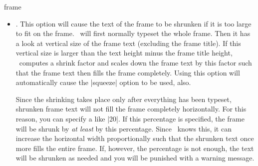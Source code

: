 \begin{environment}{{frame}%
    }
\begin{frame}[<+->][plain]
\begin{frame}[plain]
\begin{itemize}
  \example A frame with a picture completely filling the frame:  
\begin{verbatim}
\begin{frame}[plain]
  \begin{centering}%
    \pgfimage[height=\paperheight]{somebigimagefile}%
    \par%
  \end{centering}%
\end{frame}
\end{verbatim}
  
  \example A title page, in which the head- and footlines are replaced
  by two graphics.
\begin{verbatim}
\usetitlepagetemplate{
  \pgfuseimage{toptitle}
  \vskip0pt plus 1filll

  \begin{centering}
    \Large{\textbf{\inserttitle}}
    
    \insertdate
  \end{centering}

  \vskip0pt plus 1filll
  \pgfuseimage{bottomtitle}
}
\begin{frame}[plain]
  \titlepage
\end{frame}
\end{verbatim}
  \item
    . This
    option will cause the text of the frame to be shrunken if it is
    too large to fit on the frame. \beamer\ will first normally
    typeset the whole frame. Then it has a look at vertical size of
    the frame text (excluding the frame title). If this vertical size
    is larger than  the text height minus the frame title height,
    \beamer\ computes a shrink factor and scales down the frame text
    by this factor such that the frame text then fills the frame
    completely. Using this option will automatically cause the
    |squeeze| option to be used, also.

    Since the shrinking takes place only after everything has been
    typeset, shrunken frame text will not fill the frame completely
    horizontally. For this reason, you can specify a  like |20|. If this percentage is specified, the
    frame will be shrunk by \emph{at least} by this percentage. Since
    \beamer\ knows this, it can increase the horizontal width
    proportionally such that the shrunken text once more fills the
    entire frame. If, however, the percentage is not enough, the text
    will be shrunken as needed and you will be punished with a warning
    message.


\end{itemize}
\end{frame}
\end{frame}
\end{environment}

